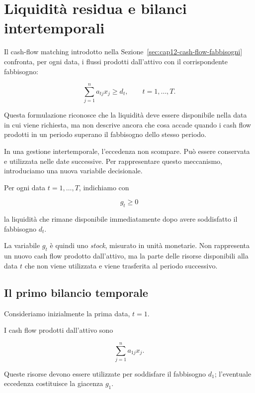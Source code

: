 \section{Liquidit\`a residua e bilanci intertemporali}

\label{sec:cap12-bilanci-intertemporali}

Il cash-flow matching introdotto nella
Sezione~\ref{sec:cap12-cash-flow-fabbisogni} confronta, per ogni data,
i flussi prodotti dall'attivo con il corrispondente fabbisogno:

\[
\sum_{j=1}^{n}a_{tj}x_j
\geq
d_t,
\qquad
t=1,\ldots,T.
\]

Questa formulazione riconosce che la liquidit\`a deve essere disponibile
nella data in cui viene richiesta, ma non descrive ancora che cosa accade
quando i cash flow prodotti in un periodo superano il fabbisogno dello stesso
periodo.

In una gestione intertemporale, l'eccedenza non scompare. Pu\`o essere
conservata e utilizzata nelle date successive. Per rappresentare questo
meccanismo, introduciamo una nuova variabile decisionale.

\begin{definition}

Per ogni data $t=1,\ldots,T$, indichiamo con

\[
g_t\geq0
\]

\noindent la liquidit\`a che rimane disponibile immediatamente dopo avere soddisfatto
il fabbisogno $d_t$.

\end{definition}

La variabile $g_t$ \`e quindi uno \emph{stock}, misurato in unit\`a
monetarie. Non rappresenta un nuovo cash flow prodotto dall'attivo, ma la
parte delle risorse disponibili alla data $t$ che non viene utilizzata e
viene trasferita al periodo successivo.

\subsection{Il primo bilancio temporale}

Consideriamo inizialmente la prima data, $t=1$.

I cash flow prodotti dall'attivo sono

\[
\sum_{j=1}^{n}a_{1j}x_j.
\]

Queste risorse devono essere utilizzate per soddisfare il fabbisogno $d_1$;
l'eventuale eccedenza costituisce la giacenza $g_1$.

